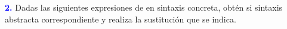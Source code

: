\vspace*{0.5cm}
\textbf{\textcolor{blue}{2.}} Dadas las siguientes expresiones de 
en sintaxis concreta, obtén si sintaxis abstracta correspondiente y realiza
la sustitución que se indica.

